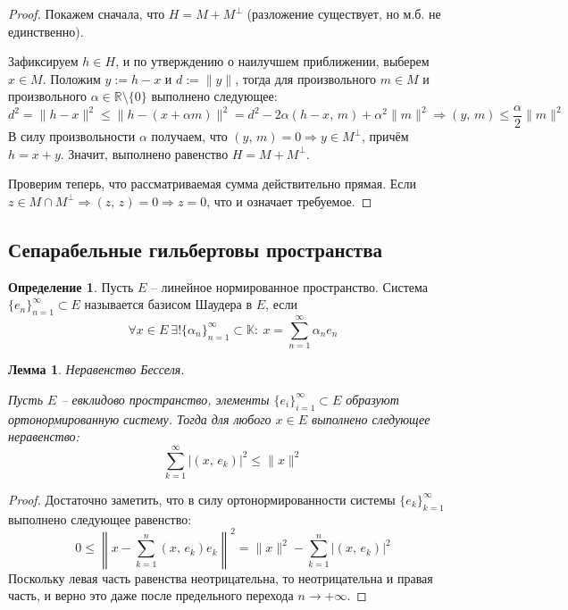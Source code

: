 \documentclass[a4paper,12pt]{article}
\renewcommand{\leq}{\ensuremath{\leqslant}}
\theoremstyle{plain}
\newtheorem{lemma}{Лемма}[section]
\theoremstyle{definition}
\newtheorem{definition}{Определение}[section]
\theoremstyle{remark}
\begin{document}
\begin{proof}
	Покажем сначала, что $H = M + M^\bot$ (разложение существует, но м.б. не единственно).

	Зафиксируем $h \in H$, и по утверждению о наилучшем приближении, выберем $x \in M$. Положим $y := h - x$ и $d := \|y\|$, тогда для произвольного $m \in M$ и произвольного $\alpha \in \mathbb{R}\setminus \{0\}$ выполнено следующее:
	\[
		d^2 = \|h - x\|^2 \leq \|h - (x + \alpha m)\|^2 = d^2 - 2\alpha(h - x,\, m) + \alpha^2\|m\|^2 \Rightarrow (y,\, m) \leq \frac{\alpha}{2}\|m\|^2
	\]
	В силу произвольности $\alpha$ получаем, что $(y,\, m) = 0 \Rightarrow y \in M^\bot$, причём $h = x+ y$. Значит, выполнено равенство $H = M + M^\bot$.

	Проверим теперь, что рассматриваемая сумма действительно прямая. Если $z \in M \cap M^\bot \Rightarrow (z,\,z) = 0 \Rightarrow z = 0$, что и означает требуемое.
\end{proof}

\subsection{Сепарабельные гильбертовы пространства}
\begin{definition}
	Пусть $E$ -- линейное нормированное пространство. Система $\{e_n\}_{n=1}^\infty \subset E$ называется базисом Шаудера в $E$, если
	\[
		\forall x \in E \: \exists! \{\alpha_n\}_{n = 1}^\infty \subset \mathbb{K} :\: x = \sum_{n = 1}^\infty \alpha_ne_n
	\]
\end{definition}

\begin{lemma}
	Неравенство Бесселя.

	Пусть $E$ -- евклидово пространство, элементы $\{e_i\}_{i=1}^\infty \subset E$ образуют ортонормированную систему. Тогда для любого $x \in E$ выполнено следующее неравенство:
	\[
		\sum_{k = 1}^\infty \vert(x,\, e_k)\vert^2 \leq \|x\|^2
	\]
\end{lemma}

\begin{proof}
	Достаточно заметить, что в силу ортонормированности системы $\{e_k\}_{k = 1}^\infty$ выполнено следующее равенство:
	\[
		0 \leq \left\|x - \sum_{k = 1}^n (x,\, e_k)e_k\right\|^2 = \|x\|^2 - \sum_{k = 1}^n \vert(x,\, e_k)\vert^2
	\]
	Поскольку левая часть равенства неотрицательна, то неотрицательна и правая часть, и верно это даже после предельного перехода $n \to +\infty$.
\end{proof}
\end{document}
